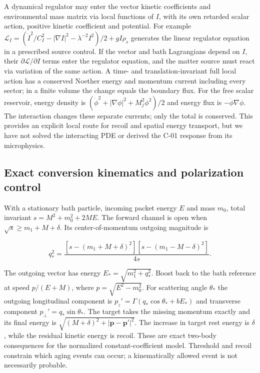 \documentclass[
  11pt,
  twoside]{article}
\begin{document}
A dynamical regulator may enter the vector kinetic coefficients and
environmental mass matrix via local functions of \(I\), with its own
retarded scalar action, positive kinetic coefficient and potential. For
example
\(\mathcal L_I=(\dot I^2/C_I^2-|\nabla I|^2-\lambda^{-2}I^2)/2+gI\rho_s\)
generates the linear regulator equation in a prescribed source control.
If the vector and bath Lagrangians depend on \(I\), their
\(\partial\mathcal L/\partial I\) terms enter the regulator equation,
and the matter source must react via variation of the same action. A
time- and translation-invariant full local action has a conserved
Noether energy and momentum current including every sector; in a finite
volume the change equals the boundary flux. For the free scalar
reservoir, energy density is
\((\dot\phi^2+|\nabla\phi|^2+M_j^2\phi^2)/2\) and energy flux is
\(-\dot\phi\nabla\phi\). The interaction changes these separate
currents; only the total is conserved. This provides an explicit local
route for recoil and spatial energy transport, but we have not solved
the interacting PDE or derived the C-01 response from its microphysics.

\subsection{Exact conversion kinematics and polarization
control}\label{exact-conversion-kinematics-and-polarization-control}

With a stationary bath particle, incoming packet energy \(E\) and mass
\(m_0\), total invariant \(s=M^2+m_0^2+2ME\). The forward channel is
open when \(\sqrt{s}\geq m_1+M+\delta\). Its center-of-momentum outgoing
magnitude is

\[q_*^2=\frac{[s-(m_1+M+\delta)^2][s-(m_1-M-\delta)^2]}{4s}.\tag{H4}\]

The outgoing vector has energy \(E_*=\sqrt{m_1^2+q_*^2}\). Boost back to
the bath reference at speed \(p/(E+M)\), where \(p=\sqrt{E^2-m_0^2}\).
For scattering angle \(\theta_*\) the outgoing longitudinal component is
\(p_z'=\Gamma(q_*\cos\theta_*+bE_*)\) and transverse component
\(p_\perp'=q_*\sin\theta_*\). The target takes the missing momentum
exactly and its final energy is
\(\sqrt{(M+\delta)^2+|\mathbf{p}-\mathbf{p}'|^2}\). The increase in
target rest energy is \(\delta\), while the residual kinetic energy is
recoil. These are exact two-body consequences for the normalized
constant-coefficient model. Threshold and recoil constrain which aging
events can occur; a kinematically allowed event is not necessarily
probable.
\end{document}
